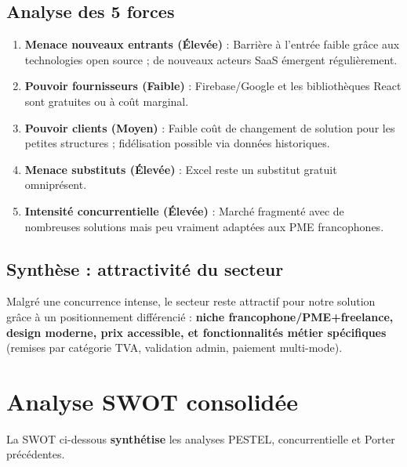 \documentclass[12pt,a4paper]{report}
\begin{document}
\subsection{Analyse des 5 forces}
\begin{enumerate}
    \item \textbf{Menace nouveaux entrants (Élevée)} : Barrière à l'entrée faible grâce aux technologies open source ; de nouveaux acteurs SaaS émergent régulièrement.
    \item \textbf{Pouvoir fournisseurs (Faible)} : Firebase/Google et les bibliothèques React sont gratuites ou à coût marginal.
    \item \textbf{Pouvoir clients (Moyen)} : Faible coût de changement de solution pour les petites structures ; fidélisation possible via données historiques.
    \item \textbf{Menace substituts (Élevée)} : Excel reste un substitut gratuit omniprésent.
    \item \textbf{Intensité concurrentielle (Élevée)} : Marché fragmenté avec de nombreuses solutions mais peu vraiment adaptées aux PME francophones.
\end{enumerate}

\subsection{Synthèse : attractivité du secteur}

Malgré une concurrence intense, le secteur reste attractif pour notre solution grâce à un positionnement différencié : \textbf{niche francophone/PME+freelance, design moderne, prix accessible, et fonctionnalités métier spécifiques} (remises par catégorie TVA, validation admin, paiement multi-mode).

\section{Analyse SWOT consolidée}

La SWOT ci-dessous \textbf{synthétise} les analyses PESTEL, concurrentielle et Porter précédentes.
\end{document}
